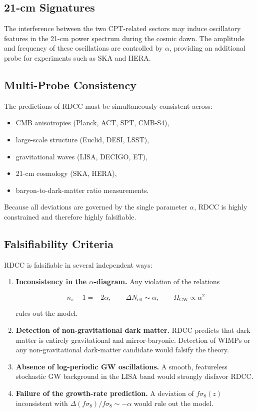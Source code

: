 \documentclass[11pt,a4paper]{article}
\begin{document}
\subsection{21-cm Signatures}

The interference between the two CPT-related sectors may induce oscillatory
features in the 21-cm power spectrum during the cosmic dawn. The amplitude and
frequency of these oscillations are controlled by \(\alpha\), providing an
additional probe for experiments such as SKA and HERA.

\subsection{Multi-Probe Consistency}

The predictions of RDCC must be simultaneously consistent across:
\begin{itemize}
    \item CMB anisotropies (Planck, ACT, SPT, CMB-S4),
    \item large-scale structure (Euclid, DESI, LSST),
    \item gravitational waves (LISA, DECIGO, ET),
    \item 21-cm cosmology (SKA, HERA),
    \item baryon-to-dark-matter ratio measurements.
\end{itemize}
Because all deviations are governed by the single parameter \(\alpha\), RDCC is
highly constrained and therefore highly falsifiable.

\subsection{Falsifiability Criteria}

RDCC is falsifiable in several independent ways:

\begin{enumerate}
    \item \textbf{Inconsistency in the \(\alpha\)-diagram.}
    Any violation of the relations
    

\[
        n_{s} - 1 = -2\alpha,
        \qquad
        \Delta N_{\mathrm{eff}} \sim \alpha,
        \qquad
        \Omega_{\mathrm{GW}} \propto \alpha^{2}
    \]

    rules out the model.

    \item \textbf{Detection of non-gravitational dark matter.}
    RDCC predicts that dark matter is entirely gravitational and mirror-baryonic.
    Detection of WIMPs or any non-gravitational dark-matter candidate would
    falsify the theory.

    \item \textbf{Absence of log-periodic GW oscillations.}
    A smooth, featureless stochastic GW background in the LISA band would
    strongly disfavor RDCC.

    \item \textbf{Failure of the growth-rate prediction.}
    A deviation of \(f\sigma_{8}(z)\) inconsistent with
    \(\Delta(f\sigma_{8})/f\sigma_{8} \sim -\alpha\) would rule out the model.
\end{enumerate}
\end{document}
